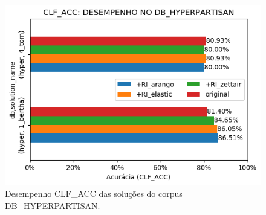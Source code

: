 \begin{figure}[h]
    \centering
    \caption{Desempenho CLF\_ACC das soluções do corpus DB\_HYPERPARTISAN.}
    \vspace{-0.0cm}
    \begin{center}
        \includegraphics[width=1.0\textwidth]{img/clf-acc-bars-hyperpartisan.png}
    \end{center}
    \vspace{-0.0cm}
    \label{fig:clf-acc-bars-hyperpartisan}
\end{figure}